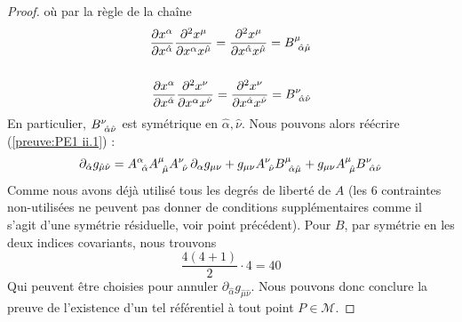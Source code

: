 \begin{proof}
où par la règle de la chaîne 
\begin{align}
    \frac{\partial x^{\alpha}}{\partial x^{\hat{\alpha}}} \frac{\partial^2 x^{\mu}}{\partial x^{\alpha}x^{\hat{\mu}}} = \frac{\partial^2 x^{\mu}}{\partial x^{\hat{\alpha}}x^{\hat{\mu}}} = B\indices{^{\mu}_{\!\hat{\alpha} \hat{\mu}}}\\
    \nonumber
    \, \\
    \frac{\partial x^{\alpha}}{\partial x^{\hat{\alpha}}} \frac{\partial^2 x^{\nu}}{\partial x^{\alpha}x^{\hat{\nu}}} = \frac{\partial^2 x^{\nu}}{\partial x^{\hat{\alpha}}x^{\hat{\nu}}} = B\indices{^{\nu}_{\!\hat{\alpha} \hat{\nu}}}
\end{align}
En particulier, $B\indices{^{\nu}_{\!\hat{\alpha} \hat{\nu}}}$ est symétrique en $\hat{\alpha}, \hat{\nu}$. Nous pouvons alors réécrire (\ref{preuve:PE1 ii.1}) :
\begin{equation}
    \partial_{\hat{\alpha}}g_{\hat{\mu}\hat{\nu}} = A\indices{^{\alpha}_{\!\hat{\alpha}}} A\indices{^{\mu}_{\!\hat{\mu}}} A\indices{^{\nu}_{\!\hat{\nu}}}\, \partial_{\alpha} g_{\mu \nu} + g_{\mu \nu}A\indices{^{\nu}_{\!\hat{\nu}}} B\indices{^{\mu}_{\!\hat{\alpha} \hat{\mu}}} + g_{\mu \nu}A\indices{^{\mu}_{\!\hat{\mu}}}B\indices{^{\nu}_{\!\hat{\alpha} \hat{\nu}}} 
\end{equation}
Comme nous avons déjà utilisé tous les degrés de liberté de $A$ (les 6 contraintes non-utilisées ne peuvent pas donner de conditions supplémentaires comme il s'agit d'une symétrie résiduelle, voir point précédent). Pour $B$, par symétrie en les deux indices covariants, nous trouvons 
\begin{equation}
    \frac{4(4+1)}{2} \cdot 4 = 40
\end{equation}
Qui peuvent être choisies pour annuler $\partial_{\hat{\alpha}}g_{\hat{\mu}\hat{\nu}}$. Nous pouvons donc conclure la preuve de l'existence d'un tel référentiel à tout point $P\in \mathcal{M}$.
\end{proof}
